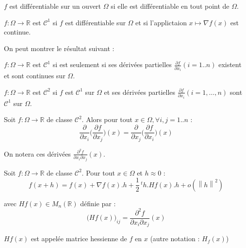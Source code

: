\documentclass[a4paper,11pt]{article}
\newcommand{\R}{\mathbb{R}}
\newcommand{\norm}[1]{\left\lVert#1\right\rVert}
\newcommand{\tpo}[1]{\,^t#1}
\newcommand{\derpart}[2]{\displaystyle\frac{\partial#1}{\partial #2}}
\theoremstyle{plain} %
\begin{document}
\begin{fdef}
    $f$ est différentiable sur un ouvert $\Omega$ si elle est différentiable en tout point
    de $\Omega$.
\end{fdef}

\begin{fdef}
    $f : \Omega \longrightarrow \R$ est $\mathcal{C}^1$ si $f$ est différentiable sur
    $\Omega$ et si l'applictaion $x \mapsto \nabla f(x)$ est continue.
\end{fdef}

On peut montrer le résultat suivant :

\begin{lemme}
    $f : \Omega \longrightarrow \R$ est $\mathcal{C}^1$ si est seulement si ses dérivées
    partielles $\derpart{f}{x_i}(i=1..n)$ existent et sont continues sur $\Omega$.
\end{lemme}

\begin{fdef}
    $f : \Omega \longrightarrow \R$ est $\mathcal{C}^2$ si $f$ est $\mathcal{C}^1$ sur
    $\Omega$ et ses dérivées partielles $\derpart{f}{x_i}(i=1,\dots,n)$ sont $\mathcal{C}^1$
    sur $\Omega$.
\end{fdef}

\begin{lemme}[de Schwarz]
    Soit $f : \Omega \longrightarrow \R$ de classe $\mathcal{C}^2$. Alors pour tout $x \in
    \Omega, \forall i,j = 1..n$ : 
    \[
        \frac{\partial}{\partial x_i} \Big( \derpart{f}{x_j} \Big) (x) =
        \frac{\partial}{\partial x_j} \Big( \derpart{f}{x_i} \Big) (x)
    \]
\end{lemme}

\begin{remark}
    On notera ces dérivées $\derpart{^2f}{x_i \partial x_j}(x)$.
\end{remark}

\begin{ftheo}
    Soit $f : \Omega \longrightarrow \R$ de classe $\mathcal{C}^2$. Pour tout $x \in \Omega$
    et $h \approx 0$ : 
\[
    f(x+h) = f(x) + \nabla f(x).h + \frac{1}{2} \tpo{h} . Hf(x) . h + o(\norm{h}^2)
\]

    avec $Hf(x) \in M_n(\R)$ définie par :
    \[
        \Big( Hf(x) \Big)_{ij} = \derpart{^2f}{x_i \partial x_j}(x)
    \]

    $Hf(x)$ est appelée matrice hessienne de $f$ en $x$ (autre notation : $H_f(x)$)
\end{ftheo}
\end{document}
